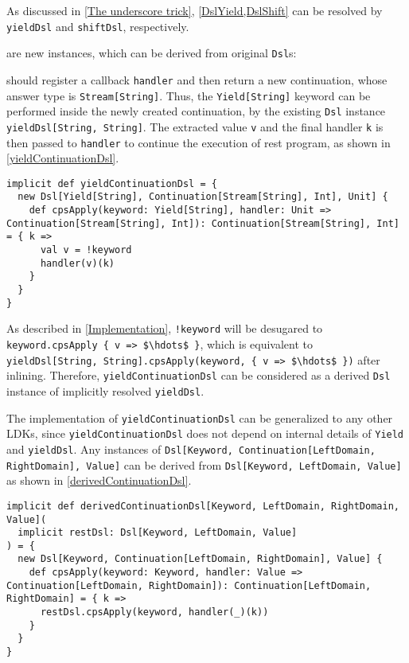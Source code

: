 As discussed in \cref{The underscore trick}, \cref{DslYield,DslShift} can be resolved by \lstinline{yieldDsl} and \lstinline{shiftDsl}, respectively.

 are new instances, which can be derived from original \lstinline{Dsl}s:

 should register a callback \lstinline{handler} and then return a new continuation, whose answer type is \lstinline{Stream[String]}. Thus, the \lstinline{Yield[String]} keyword can be performed inside the newly created continuation, by the existing \lstinline{Dsl} instance \lstinline{yieldDsl[String, String]}. The extracted value \lstinline{v} and the final handler \lstinline{k} is then passed to \lstinline{handler} to continue the execution of rest program, as shown in \cref{yieldContinuationDsl}.

\begin{lstlisting}[caption={The derived \lstinline{Dsl} instance for \lstinline{Yield} LDK, which can be used in a \lstinline{Continuation}},label={yieldContinuationDsl}]
implicit def yieldContinuationDsl = {
  new Dsl[Yield[String], Continuation[Stream[String], Int], Unit] {
    def cpsApply(keyword: Yield[String], handler: Unit => Continuation[Stream[String], Int]): Continuation[Stream[String], Int] = { k =>
      val v = !keyword
      handler(v)(k)
    }
  }
}
\end{lstlisting}

As described in \cref{Implementation}, \lstinline{!keyword} will be desugared to \lstinline[mathescape=true]|keyword.cpsApply { v => $\hdots$ }|, which is equivalent to \lstinline[mathescape=true]|yieldDsl[String, String].cpsApply(keyword, { v => $\hdots$ })| after inlining. Therefore, \lstinline{yieldContinuationDsl} can be considered as a derived \lstinline{Dsl} instance of implicitly resolved \lstinline{yieldDsl}.

The implementation of \lstinline{yieldContinuationDsl} can be generalized to any other LDKs, since \lstinline{yieldContinuationDsl} does not depend on internal details of \lstinline{Yield} and \lstinline{yieldDsl}. Any instances of \lstinline{Dsl[Keyword, Continuation[LeftDomain, RightDomain], Value]} can be derived from \lstinline{Dsl[Keyword, LeftDomain, Value]} as shown in \cref{derivedContinuationDsl}.

\begin{lstlisting}[caption={The generic derived \lstinline{Dsl} instance for any LDK, which can be used in a \lstinline{Continuation}},label={derivedContinuationDsl}]
implicit def derivedContinuationDsl[Keyword, LeftDomain, RightDomain, Value](
  implicit restDsl: Dsl[Keyword, LeftDomain, Value]
) = {
  new Dsl[Keyword, Continuation[LeftDomain, RightDomain], Value] {
    def cpsApply(keyword: Keyword, handler: Value => Continuation[LeftDomain, RightDomain]): Continuation[LeftDomain, RightDomain] = { k =>
      restDsl.cpsApply(keyword, handler(_)(k))
    }
  }
}
\end{lstlisting}

